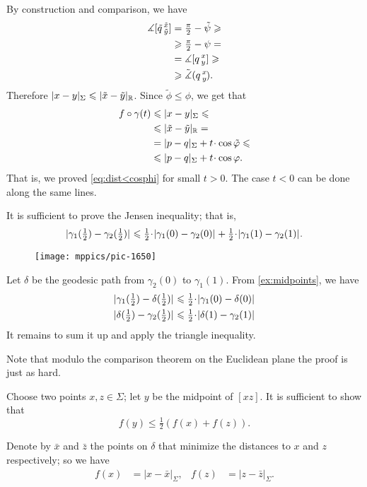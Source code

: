 By construction and comparison, we have 
\begin{align*}
\measuredangle[\tilde q\,{}^{\tilde x}_{\tilde y}]&=\tfrac\pi2-\tilde\psi
\geqslant
\\
&\geqslant
\tfrac\pi2-\psi
=
\\
&=
\measuredangle[q\,{}^{x}_{y}]
\geqslant 
\\
&\geqslant \tilde\measuredangle(q\,{}^{x}_{y}\hspace{-0.2ex}).
\end{align*}
Therefore $|x-y|_\Sigma\leqslant |\tilde x-\tilde y|_{\mathbb{R}}$.
Since $\tilde\phi\le\phi$, we get that
\begin{align*}
f\circ\gamma(t)&\le |x-y|_\Sigma\le 
\\
&\le|\tilde x-\tilde y|_{\RR}=
\\
&=|p-q|_\Sigma+t\cdot\cos\tilde\phi
\le
\\
&\le|p-q|_\Sigma+t\cdot\cos\phi.
\end{align*}
That is, we proved \ref{eq:dist<cosphi} for small $t>0$.
The case $t<0$ can be done along the same lines. 

It is sufficient to prove the Jensen inequality;
that is, 
\[
\dist{\gamma_1(\tfrac12)}{\gamma_2(\tfrac12)}{}
\le
\tfrac12\cdot\dist{\gamma_1(0)}{\gamma_2(0)}{}
+
\tfrac12\cdot \dist{\gamma_1(1)}{\gamma_2(1)}{}.
\]



{

\begin{wrapfigure}{o}{46 mm}
\vskip-0mm
\centering
\texttt{[image: mppics/pic-1650]}
\end{wrapfigure}

Let $\delta$ be the geodesic path from $\gamma_2(0)$ to $\gamma_1(1)$.
From \ref{ex:midpoints}, we have
\begin{align*}
\dist{\gamma_1(\tfrac12)}{\delta(\tfrac12)}{}
&\le
\tfrac12\cdot\dist{\gamma_1(0)}{\delta(0)}{}
\\
\dist{\delta(\tfrac12)}{\gamma_2(\tfrac12)}{}
&\le
\tfrac12\cdot\dist{\delta(1)}{\gamma_2(1)}{}
\end{align*}
It remains to sum it up and apply the triangle inequality.

 Note that modulo the comparison theorem 
on the Euclidean plane the proof is just as hard.

}

Choose two points $x,z\in\Sigma$;
let $y$ be the midpoint of $[xz]$.
It is sufficient to show that 
\[f(y)\le \tfrac12(f(x)+f(z)).\]

Denote by $\bar x$ and $\bar z$ the points on $\delta$ that minimize the distances to $x$ and $z$ respectively;
so we have
\begin{align*}
f(x)
&=|x-\bar x|_\Sigma,
&
f(z)
&=|z-\bar z|_\Sigma.
\end{align*}

